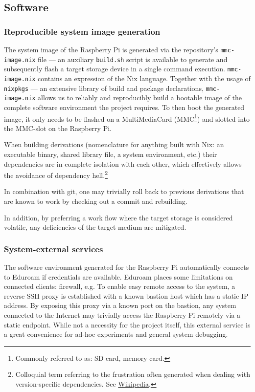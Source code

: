 \subsection{Software}
\subsubsection{Reproducible system image generation}
The system image of the Raspberry Pi is generated via the repository's \texttt{mmc-image.nix} file ---
an auxiliary \texttt{build.sh} script is available to generate and subsequently flash a target storage device in a single command execution.
\texttt{mmc-image.nix} contains an expression of the Nix language.
Together with the usage of \texttt{nixpkgs} --- an extensive library of build and package declarations,
\texttt{mmc-image.nix} allows us to reliably and reproducibly build a bootable image of the complete software environment the project requires.
To then boot the generated image, it only needs to be flashed on a MultiMediaCard (MMC\footnote{Commonly referred to as: SD card, memory card.}) and slotted into the MMC-slot on the Raspberry Pi.

When building derivations (nomenclature for anything built with Nix: an executable binary, shared library file, a system environment, etc.) their dependencies are in complete isolation with each other, which effectively allows the avoidance of dependency hell.\footnote{Colloquial term referring to the frustration often generated when dealing with version-specific dependencies.
See \href{https://en.wikipedia.org/wiki/Dependency_hell}{Wikipedia}.}

In combination with git, one may trivially roll back to previous derivations that are known to work by checking out a commit and rebuilding.

In addition, by preferring a work flow where the target storage is considered volatile, any deficiencies of the target medium are mitigated.

\subsubsection{System-external services}
The software environment generated for the Raspberry Pi automatically connects to Eduroam if credentials are available.
Eduroam places some limitations on connected clients: firewall, e.g.
To enable easy remote access to the system, a reverse SSH proxy is established with a known bastion host which has a static IP address.
By exposing this proxy via a known port on the bastion, any system connected to the Internet may trivially access the Raspberry Pi remotely via a static endpoint.
While not a necessity for the project itself, this external service is a great convenience for ad-hoc experiments and general system debugging.

